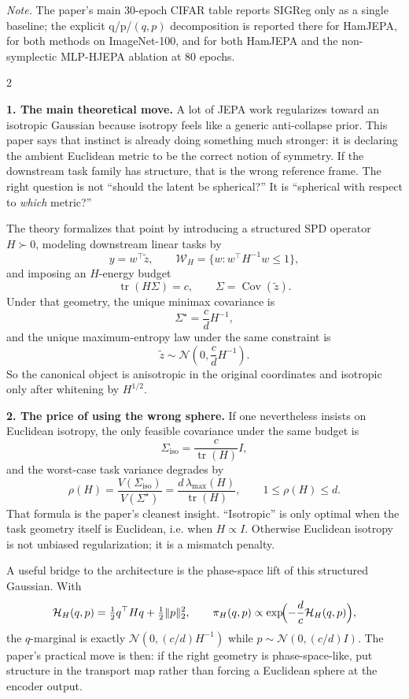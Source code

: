 \documentclass[10pt]{article}
\begin{document}
\begin{takebox}
\vspace{3pt}
{\scriptsize\emph{Note.} The paper's main 30-epoch CIFAR table reports SIGReg only as a single baseline; the explicit q/p/\((q,p)\) decomposition is reported there for HamJEPA, for both methods on ImageNet-100, and for both HamJEPA and the non-symplectic MLP-HJEPA ablation at 80 epochs.}
\end{takebox}

\vspace{4pt}
\begin{multicols}{2}

\textbf{\color{ink}1. The main theoretical move.} A lot of JEPA work regularizes toward an isotropic Gaussian because isotropy feels like a generic anti-collapse prior. This paper says that instinct is already doing something much stronger: it is declaring the ambient Euclidean metric to be the correct notion of symmetry. If the downstream task family has structure, that is the wrong reference frame. The right question is not ``should the latent be spherical?'' It is ``spherical with respect to \emph{which} metric?''

The theory formalizes that point by introducing a structured SPD operator \(H\succ0\), modeling downstream linear tasks by
\[
y=w^\top \tilde z,\qquad \mathcal W_H=\{w: w^\top H^{-1}w\le 1\},
\]
and imposing an \(H\)-energy budget
\[
\operatorname{tr}(H\Sigma)=c,\qquad \Sigma=\operatorname{Cov}(\tilde z).
\]
Under that geometry, the unique minimax covariance is
\[
\Sigma^\star=\frac{c}{d}H^{-1},
\]
and the unique maximum-entropy law under the same constraint is
\[
\tilde z\sim \mathcal N\!\left(0,\frac{c}{d}H^{-1}\right).
\]
So the canonical object is anisotropic in the original coordinates and isotropic only after whitening by \(H^{1/2}\).

\textbf{\color{ink}2. The price of using the wrong sphere.} If one nevertheless insists on Euclidean isotropy, the only feasible covariance under the same budget is
\[
\Sigma_{\mathrm{iso}}=\frac{c}{\operatorname{tr}(H)}I,
\]
and the worst-case task variance degrades by
\[
\rho(H)=\frac{V(\Sigma_{\mathrm{iso}})}{V(\Sigma^\star)}
=\frac{d\,\lambda_{\max}(H)}{\operatorname{tr}(H)},
\qquad 1\le \rho(H)\le d.
\]
That formula is the paper's cleanest insight. ``Isotropic'' is only optimal when the task geometry itself is Euclidean, i.e. when \(H\propto I\). Otherwise Euclidean isotropy is not unbiased regularization; it is a mismatch penalty.

A useful bridge to the architecture is the phase-space lift of this structured Gaussian. With
\[
\mathcal H_H(q,p)=\tfrac12 q^\top Hq+\tfrac12\|p\|_2^2,
\qquad
\pi_H(q,p)\propto \exp\!\Bigl(-\frac{d}{c}\mathcal H_H(q,p)\Bigr),
\]
the \(q\)-marginal is exactly \(\mathcal N(0,(c/d)H^{-1})\) while \(p\sim \mathcal N(0,(c/d)I)\). The paper's practical move is then: if the right geometry is phase-space-like, put structure in the transport map rather than forcing a Euclidean sphere at the encoder output.


\end{multicols}
\end{document}
